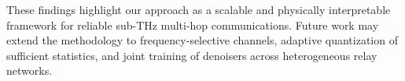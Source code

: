 \documentclass[journal]{IEEEtran}
\begin{document}
These findings highlight our approach as a scalable and physically interpretable framework for reliable sub-THz multi-hop communications. Future work may extend the methodology to frequency-selective channels, adaptive quantization of sufficient statistics, and joint training of denoisers across heterogeneous relay networks.

\balance


\end{document}

